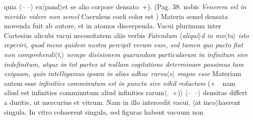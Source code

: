 quia $\langle$-- --$\rangle$ ex$\langle$pand$\rangle$et se alio corpore densato~+).
\pend%
\count{}
\count{}
\pstart%
(Pag. 38. nobis \textit{Venerem vel in meridie videre non semel
}
Caeruleus coeli color est
)
Materia\protect{} semel densata movenda fuit ab autore,
et in atomos\protect{} discerpenda.
Vacui plurimum inter 
Cartesius\protect{}
alicubi vacui\protect{} necessitatem aliis verbis
\textit{Fatendum $\langle$aliqui$\rangle$d in mo$\langle$tu$\rangle$ isto reperiri,
quod mens quidem nostra percipit verum esse,
sed tamen quo pacto fiat non comprehendi$\langle$t,$\rangle$
nempe divisionem quarundam particularum in infinitum sive indefinitum,
atque in tot partes ut nullam cogitatione\protect{}
determinare possimus tam exiguam,
quin intelligamus ipsam in alias adhuc rursu$\langle$s$\rangle$ reapse esse
}
Materiam\protect{} autem esse \textit{infinities comminutam}
\textit{est in puncta sive nihil redactam}
(+~\Denarius\ nam aliud est infinities comminutum aliud infinities rarum$\langle$.~+)$\rangle$
$\langle$--~--$\rangle$ densitas\protect{} differt a duritie,\protect{}
ut mercurius\protect{} et vitrum.\protect{}
Nam in illo  intercedit vacui,
$\langle$at inco$\rangle$haerent singula.
In vitro cohaerent singula,
sed figuras habent vacuum\protect{} non
